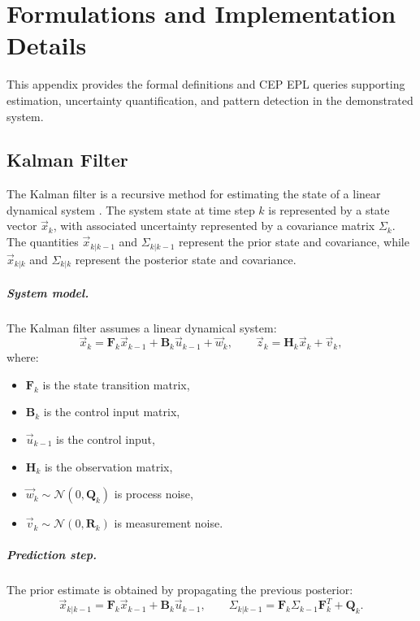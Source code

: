 \chapter{Formulations and Implementation Details}
\label{appendix_a}
This appendix provides the formal definitions and CEP EPL queries supporting estimation, uncertainty quantification, and pattern detection in the demonstrated system.

\section{Kalman Filter}\label{sec:kalman-formulation}
The Kalman filter is a recursive method for estimating the state of a linear dynamical system \cite{kalman1960new,bishop2001introduction}. The system state at time step $k$ is represented by a state vector $\vec{x}_k$, with associated uncertainty represented by a covariance matrix $\Sigma_k$. The quantities $\vec{x}_{k|k-1}$ and $\Sigma_{k|k-1}$ represent the prior state and covariance, while $\vec{x}_{k|k}$ and $\Sigma_{k|k}$ represent the posterior state and covariance.

\paragraph{System model.}
The Kalman filter assumes a linear dynamical system:
\[
\vec{x}_k = \mathbf{F}_k \vec{x}_{k-1} + \mathbf{B}_k \vec{u}_{k-1} + \vec{w}_k,
\qquad
\vec{z}_k = \mathbf{H}_k \vec{x}_k + \vec{v}_k,
\]
where:
\begin{itemize}
    \item $\mathbf{F}_k$ is the state transition matrix,
    \item $\mathbf{B}_k$ is the control input matrix,
    \item $\vec{u}_{k-1}$ is the control input,
    \item $\mathbf{H}_k$ is the observation matrix,
    \item $\vec{w}_k \sim \mathcal{N}(0, \mathbf{Q}_k)$ is process noise,
    \item $\vec{v}_k \sim \mathcal{N}(0, \mathbf{R}_k)$ is measurement noise.
\end{itemize}

\paragraph{Prediction step.}
The prior estimate is obtained by propagating the previous posterior:
\[
\vec{x}_{k|k-1} = \mathbf{F}_k \vec{x}_{k-1} + \mathbf{B}_k \vec{u}_{k-1},
\qquad
\Sigma_{k|k-1} = \mathbf{F}_k \Sigma_{k-1} \mathbf{F}_k^{T} + \mathbf{Q}_k.
\]

